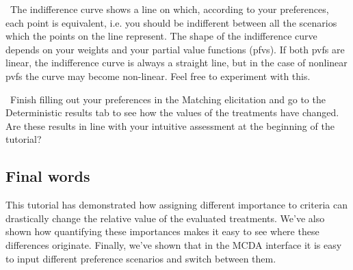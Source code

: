 \documentclass[00_mcda_tutorial.tex]{subfiles}
\begin{document}
\noindent \faGraduationCap \, The indifference curve shows a line on which, according to your preferences, each point is equivalent, i.e. you should be indifferent between all the scenarios which the points on the line represent. The shape of the indifference curve depends on your weights and your partial value functions (pfvs). If both pvfs are linear, the indifference curve is always a straight line, but in the case of nonlinear pvfs the curve may become non-linear. Feel free to experiment with this.
\newline

\noindent \leftpointright \, Finish filling out your preferences in the Matching elicitation and go to the Deterministic results tab to see how the values of the treatments have changed. Are these results in line with your intuitive assessment at the beginning of the tutorial?

\subsection*{Final words}
This tutorial has demonstrated how assigning different importance to criteria can drastically change the relative value of the evaluated treatments. We’ve also shown how quantifying these importances makes it easy to see where these differences originate. Finally, we’ve shown that in the MCDA interface it is easy to input different preference scenarios and switch between them.
\end{document}
